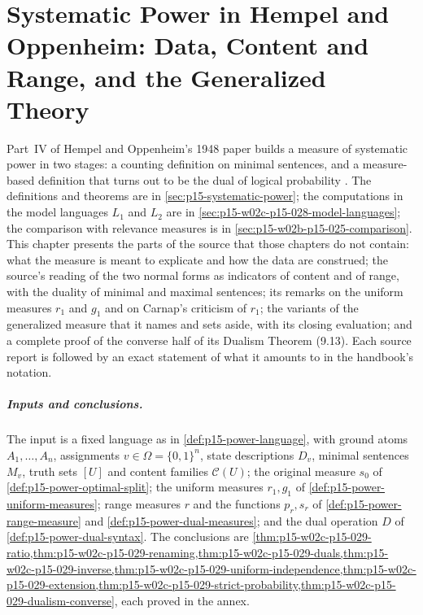 \chapter{Systematic Power in Hempel and Oppenheim: Data, Content and Range, and the Generalized Theory}
\label{sec:p15-w02c-p15-029-hempel-oppenheim}

Part~IV of Hempel and Oppenheim's 1948 paper builds a measure of
systematic power in two stages: a counting definition on minimal
sentences, and a measure-based definition that turns out to be the dual
of logical probability \cite[pp.~164--173]{HempelOppenheim1948Explanation}.
The definitions and theorems are in \cref{sec:p15-systematic-power}; the
computations in the model languages \(L_1\) and \(L_2\) are in
\cref{sec:p15-w02c-p15-028-model-languages}; the comparison with
relevance measures is in \cref{sec:p15-w02b-p15-025-comparison}. This
chapter presents the parts of the source that those chapters do not
contain: what the measure is meant to explicate and how the data are
construed; the source's reading of the two normal forms as indicators of
content and of range, with the duality of minimal and maximal sentences;
its remarks on the uniform measures \(r_1\) and \(g_1\) and on Carnap's
criticism of \(r_1\); the variants of the generalized measure that it
names and sets aside, with its closing evaluation; and a complete proof
of the converse half of its Dualism Theorem (9.13). Each source report is
followed by an exact statement of what it amounts to in the handbook's
notation.

\paragraph{Inputs and conclusions.}
The input is a fixed language as in \cref{def:p15-power-language}, with
ground atoms \(A_1,\ldots,A_n\), assignments \(v\in\Omega=\{0,1\}^n\),
state descriptions \(D_v\), minimal sentences \(M_v\), truth sets \([U]\)
and content families \(\mathcal C(U)\); the original measure \(s_0\) of
\cref{def:p15-power-optimal-split}; the uniform measures \(r_1,g_1\) of
\cref{def:p15-power-uniform-measures}; range measures \(r\) and the
functions \(p_r,s_r\) of \cref{def:p15-power-range-measure} and
\cref{def:p15-power-dual-measures}; and the dual operation \(D\) of
\cref{def:p15-power-dual-syntax}. The conclusions are
\cref{thm:p15-w02c-p15-029-ratio,thm:p15-w02c-p15-029-renaming,thm:p15-w02c-p15-029-duals,thm:p15-w02c-p15-029-inverse,thm:p15-w02c-p15-029-uniform-independence,thm:p15-w02c-p15-029-extension,thm:p15-w02c-p15-029-strict-probability,thm:p15-w02c-p15-029-dualism-converse},
each proved in the annex.

